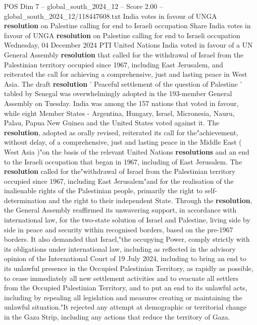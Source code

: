 \begin{textsample}{POS Dim 7 – global\_south\_2024\_12 – Score 2.00 – global\_south\_2024\_12/118447608.txt}  \label{ex:f7_pos_155}
India votes in favour of UNGA \textbf{resolution} on Palestine calling for end to Israeli occupation Share India votes in favour of UNGA \textbf{resolution} on Palestine calling for end to Israeli occupation Wednesday, 04 December 2024 PTI United Nations India voted in favour of a UN General Assembly \textbf{resolution} that called for the withdrawal of Israel from the Palestinian territory occupied since 1967, including East Jerusalem, and reiterated the call for achieving a comprehensive, just and lasting peace in West Asia.
The draft \textbf{resolution} ' Peaceful settlement of the question of Palestine ' tabled by Senegal was overwhelmingly adopted in the 193-member General Assembly on Tuesday.
India was among the 157 nations that voted in favour, while eight Member States - Argentina, Hungary, Israel, Micronesia, Nauru, Palau, Papua New Guinea and the United States voted against it.
The \textbf{resolution}, adopted as orally revised, reiterated its call for the"achievement, without delay, of a comprehensive, just and lasting peace in the Middle East ( West Asia )"on the basis of the relevant United Nations \textbf{resolutions} and an end to the Israeli occupation that began in 1967, including of East Jerusalem.
The \textbf{resolution} called for the"withdrawal of Israel from the Palestinian territory occupied since 1967, including East Jerusalem"and for the realisation of the inalienable rights of the Palestinian people, primarily the right to self-determination and the right to their independent State.
Through the \textbf{resolution}, the General Assembly reaffirmed its unwavering support, in accordance with international law, for the two-state solution of Israel and Palestine, living side by side in peace and security within recognised borders, based on the pre-1967 borders.
It also demanded that Israel,"the occupying Power, comply strictly with its obligations under international law, including as reflected in the advisory opinion of the International Court of 19 July 2024, including to bring an end to its unlawful presence in the Occupied Palestinian Territory, as rapidly as possible, to cease immediately all new settlement activities and to evacuate all settlers from the Occupied Palestinian Territory, and to put an end to its unlawful acts, including by repealing all legislation and measures creating or maintaining the unlawful situation."It rejected any attempt at demographic or territorial change in the Gaza Strip, including any actions that reduce the territory of Gaza.

\end{textsample}
